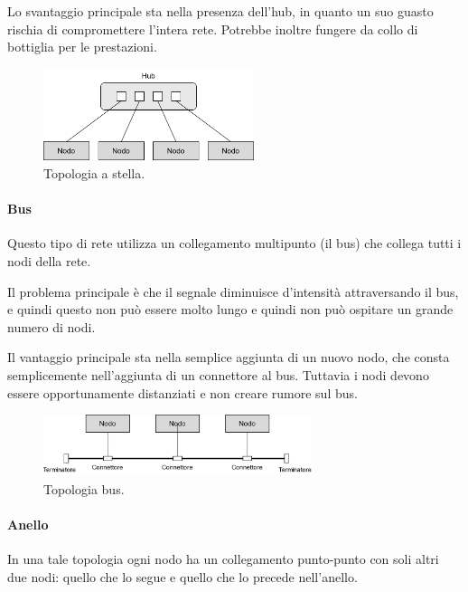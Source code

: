             Lo svantaggio principale sta nella presenza dell'hub, in quanto un suo guasto rischia di compromettere l'intera rete. Potrebbe inoltre fungere da collo di bottiglia per le prestazioni.
            
            \begin{figure}[h]
                \centering
                \includegraphics[width=0.55\textwidth]{img/stella.png}
                \caption{Topologia a stella.}
                \label{fig:img1}
            \end{figure}
            
            \newpage
            \paragraph{Bus} Questo tipo di rete utilizza un collegamento multipunto (il bus) che collega tutti i nodi della rete.
            
            Il problema principale è che il segnale diminuisce d'intensità attraversando il bus, e quindi questo non può essere molto lungo e quindi non può ospitare un grande numero di nodi.
            
            Il vantaggio principale sta nella semplice aggiunta di un nuovo nodo, che consta semplicemente nell'aggiunta di un connettore al bus. Tuttavia i nodi devono essere opportunamente distanziati e non creare rumore sul bus.
            
            \begin{figure}[h]
                \centering
                \includegraphics[width=0.70\textwidth]{img/bus.png}
                \caption{Topologia bus.}
                \label{fig:img1}
            \end{figure}
            
            \paragraph{Anello} In una tale topologia ogni nodo ha un collegamento punto-punto con soli altri due nodi: quello che lo segue e quello che lo precede nell'anello.
            
